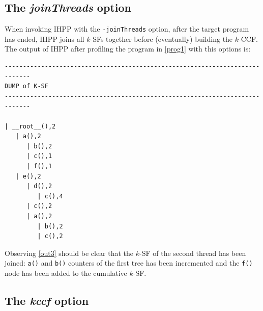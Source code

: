 \documentclass[a4paper,10pt]{report}
\begin{document}
\subsection{The \emph{joinThreads} option}

When invoking IHPP with the \verb|-joinThreads| option, 
after the target program has ended,
IHPP joins all $k$-SFs together before (eventually) building the $k$-CCF.
The output of IHPP after profiling the program in \cref{prog1} with this options is:

\begin{lstlisting}[label=out3, frame=bottomline, 
caption={the output of IHPP with the joinThreads option}]
-----------------------------------------------------------------------------
DUMP of K-SF
-----------------------------------------------------------------------------

| __root__(),2
   | a(),2
      | b(),2
      | c(),1
      | f(),1
   | e(),2
      | d(),2
         | c(),4
      | c(),2
      | a(),2
         | b(),2
         | c(),2
\end{lstlisting}
\noindent
Observing \cref{out3} should be clear that the $k$-SF of the second thread has been joined:
\verb|a()| and \verb|b()| counters of the first tree has been incremented and the \verb|f()| node has been added to the cumulative $k$-SF.

\subsection{The \emph{kccf} option}
\end{document}

